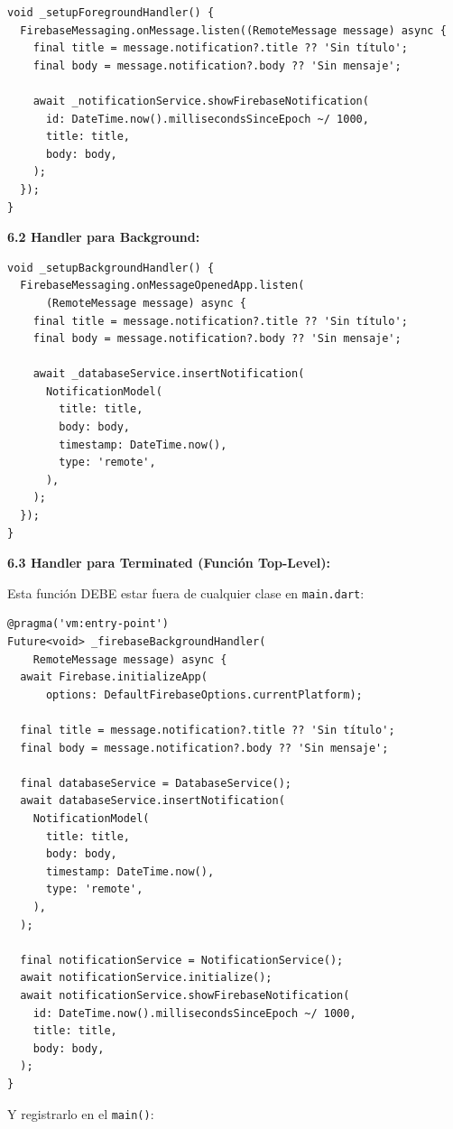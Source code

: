 \documentclass[12pt,a4paper]{article}
\begin{document}
\begin{verbatim}
void _setupForegroundHandler() {
  FirebaseMessaging.onMessage.listen((RemoteMessage message) async {
    final title = message.notification?.title ?? 'Sin título';
    final body = message.notification?.body ?? 'Sin mensaje';

    await _notificationService.showFirebaseNotification(
      id: DateTime.now().millisecondsSinceEpoch ~/ 1000,
      title: title,
      body: body,
    );
  });
}
\end{verbatim}

\textbf{6.2 Handler para Background:}

\begin{verbatim}
void _setupBackgroundHandler() {
  FirebaseMessaging.onMessageOpenedApp.listen(
      (RemoteMessage message) async {
    final title = message.notification?.title ?? 'Sin título';
    final body = message.notification?.body ?? 'Sin mensaje';

    await _databaseService.insertNotification(
      NotificationModel(
        title: title,
        body: body,
        timestamp: DateTime.now(),
        type: 'remote',
      ),
    );
  });
}
\end{verbatim}

\textbf{6.3 Handler para Terminated (Función Top-Level):}

Esta función DEBE estar fuera de cualquier clase en \texttt{main.dart}:

\begin{verbatim}
@pragma('vm:entry-point')
Future<void> _firebaseBackgroundHandler(
    RemoteMessage message) async {
  await Firebase.initializeApp(
      options: DefaultFirebaseOptions.currentPlatform);
  
  final title = message.notification?.title ?? 'Sin título';
  final body = message.notification?.body ?? 'Sin mensaje';

  final databaseService = DatabaseService();
  await databaseService.insertNotification(
    NotificationModel(
      title: title,
      body: body,
      timestamp: DateTime.now(),
      type: 'remote',
    ),
  );

  final notificationService = NotificationService();
  await notificationService.initialize();
  await notificationService.showFirebaseNotification(
    id: DateTime.now().millisecondsSinceEpoch ~/ 1000,
    title: title,
    body: body,
  );
}
\end{verbatim}

Y registrarlo en el \texttt{main()}:
\end{document}
